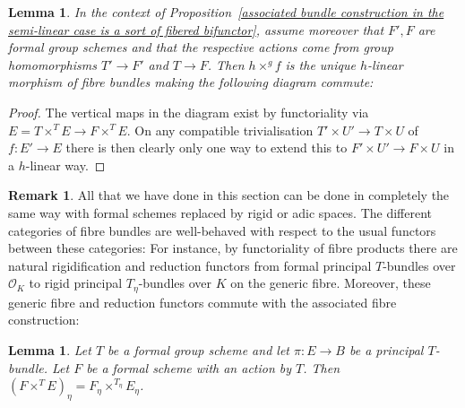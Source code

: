 \documentclass[10pt,oneside]{amsart}
\newtheorem{lemma}[theorem]{Lemma}
\theoremstyle{definition}
\newtheorem{remark}[theorem]{Remark}
\begin{document}
	\begin{lemma}\label{universal property of associated fibre construction in the semilinear case}
		In the context of Proposition~\ref{associated bundle construction in the semi-linear case is a sort of fibered bifunctor}, assume moreover that $F',F$ are formal group schemes and that the respective actions come from group homomorphisms $T'\to F'$ and $T\to F$.
		Then $h\times^g f$ is the unique $h$-linear morphism of fibre bundles making the following diagram commute:
		\begin{center}
		\end{center}
	\end{lemma}
	\begin{proof}
		 The vertical maps in the diagram exist by functoriality via $E=T\times^{T}E\rightarrow F\times^{T}E$. 
		On any compatible trivialisation $T'\times U'\rightarrow T\times U$ of $f:E'\rightarrow E$ there is then clearly only one way to extend this to $F'\times U'\rightarrow F\times U$ in a $h$-linear way.
	\end{proof}
	
	\begin{remark}\label{appendix in the case of rigid spaces and schemes}
	All that we have done in this section can be done in completely the same way with formal schemes replaced by rigid or adic spaces. The different categories of fibre bundles are well-behaved with respect to the usual functors between these categories: For instance, by functoriality of fibre products there are natural rigidification and reduction functors from formal principal $T$-bundles over $\mathcal O_K$ to rigid principal $T_\eta$-bundles over $K$ on the generic fibre. Moreover, these generic fibre and reduction functors commute with the associated fibre construction:
	\end{remark}
	\begin{lemma}\label{associated bundle commutes with generic fibre}
		Let $T$ be a formal group scheme and let $\pi\colon E\rightarrow B$ be a principal $T$-bundle. Let $F$ be a formal scheme with an action by $T$. Then $(F\times^T E)_\eta = F_\eta\times^{T_\eta} E_\eta$.
	\end{lemma}
  



 

	
	
	
\end{document}
